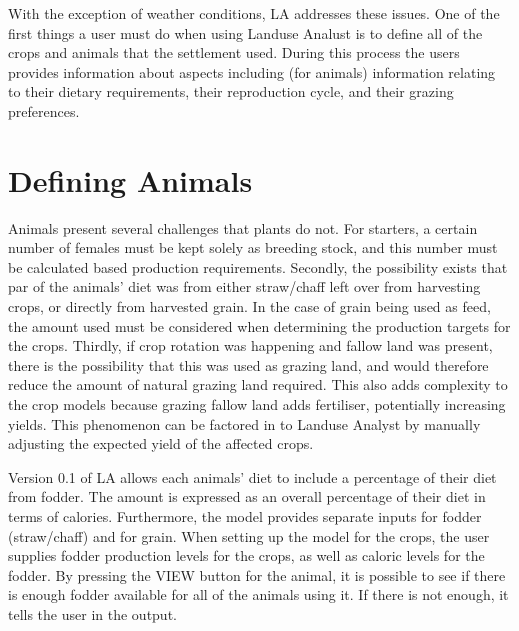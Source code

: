 With the exception of weather conditions, LA addresses these issues.  One of
the first things a user must do when using Landuse Analust is to define all
of the crops and animals that the settlement used.  During this process the
users provides information about aspects including (for animals) information
relating to their dietary requirements, their reproduction cycle, and their
grazing preferences.  

\section{Defining Animals}
  \label{definingAnimals}
Animals present several challenges that plants do not.  For starters, a certain
number of females must be kept solely as breeding stock, and this number must be
calculated based production requirements.  Secondly, the possibility exists that
par of the animals' diet was from either straw/chaff left over from harvesting
crops, or directly from harvested grain.  In the case of grain being used as
feed, the amount used must be considered when determining the production targets
for the crops.  Thirdly, if crop rotation was happening and fallow land was
present, there is the possibility that this was used as grazing land, and would
therefore reduce the amount of natural grazing land required.  This also adds
complexity to the crop models because grazing fallow land adds fertiliser,
potentially increasing yields.  This phenomenon can be factored in to Landuse
Analyst by manually adjusting the expected yield of the affected crops.

Version 0.1 of LA allows each animals' diet to include a percentage
of their diet from fodder.  The amount is expressed as an overall percentage of
their diet in terms of calories.  Furthermore, the model provides separate
inputs for fodder (straw/chaff) and for grain.  When setting up the model for
the crops, the user supplies fodder production levels for the crops, as well as
caloric levels for the fodder.  By pressing the VIEW button for the animal, it
is possible to see if there is enough fodder available for all of the animals
using it.  If there is not enough, it tells the user in the output.

